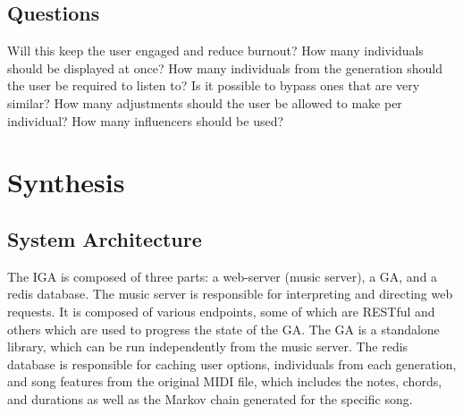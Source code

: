 \documentclass[12pt]{article} %
\begin{document}


\subsection{Questions}
Will this keep the user engaged and reduce burnout? How many individuals should be displayed at once? How many individuals from the generation should the user be required to listen to? Is it possible to bypass ones that are very similar? How many adjustments should the user be allowed to make per individual? How many influencers should be used?

\section{Synthesis}
\subsection{System Architecture}


The IGA is composed of three parts: a web-server (music server), a GA, and a redis database. The music server is responsible for interpreting and directing web requests. It is composed of various endpoints, some of which are RESTful and others which are used to progress the state of the GA. The GA is a standalone library, which can be run independently from the music server.  The redis database is responsible for caching user options, individuals from each generation, and song features from the original MIDI file, which includes the notes, chords, and durations as well as the Markov chain generated for the specific song. \\
\end{document}
